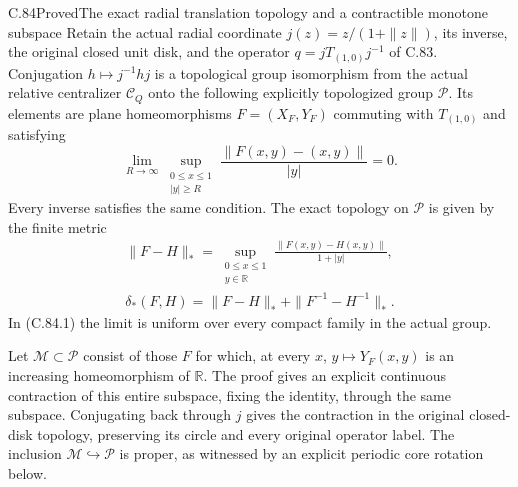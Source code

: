 \begin{claim}{C.84}{Proved}{The exact radial translation topology and a contractible monotone subspace}
Retain the actual radial coordinate
$j(z)=z/(1+\|z\|)$, its inverse, the original
closed unit disk, and the operator
$q=jT_{(1,0)}j^{-1}$ of C.83.
Conjugation $h\mapsto j^{-1}hj$ is a
topological group isomorphism from the
actual relative centralizer $\mathscr C_Q$
onto the following explicitly topologized
group $\mathscr P$.
Its elements are plane homeomorphisms
$F=(X_F,Y_F)$ commuting with $T_{(1,0)}$
and satisfying
\[
 \lim_{R\to\infty}
  \sup_{\substack{0\leq x\leq1\\ |y|\geq R}}
   \frac{\|F(x,y)-(x,y)\|}{|y|}=0.
                                                               \tag{C.84.1}
\]
Every inverse satisfies the same condition.
The exact topology on $\mathscr P$ is
given by the finite metric
\[
 \begin{gathered}
 \|F-H\|_*=
  \sup_{\substack{0\leq x\leq1\\ y\in\mathbb R}}
     \frac{\|F(x,y)-H(x,y)\|}{1+|y|},\\
 \delta_*(F,H)=\|F-H\|_*+\|F^{-1}-H^{-1}\|_*.
 \end{gathered}                                                  \tag{C.84.2}
\]
In (C.84.1) the limit is uniform over
every compact family in the actual group.

Let $\mathscr M\subset\mathscr P$ consist
of those $F$ for which, at every $x$,
$y\mapsto Y_F(x,y)$ is an increasing
homeomorphism of $\mathbb R$.
The proof gives an explicit continuous
contraction of this entire subspace,
fixing the identity, through the same
subspace. Conjugating back through $j$
gives the contraction in the original
closed-disk topology, preserving its
circle and every original operator label.
The inclusion $\mathscr M\hookrightarrow\mathscr P$
is proper, as witnessed by an explicit
periodic core rotation below.
\end{claim}

